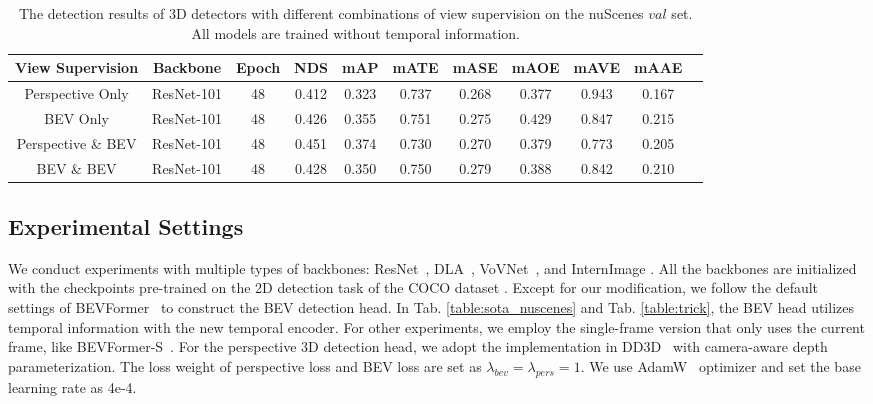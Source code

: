 \documentclass[10pt,twocolumn,letterpaper]{article}
\begin{document}
\begin{table*}[t]
    \caption{The detection results of 3D detectors with different combinations of view supervision on the nuScenes $val$ set. All models are trained without temporal information.}
    \label{table:view_supervision}
    \centering

    \begin{tabular}{c|c|c|cc|cccccc}
        \toprule
        View Supervision & Backbone & Epoch & NDS & mAP & mATE & mASE & mAOE & mAVE & mAAE   \\ 
        \midrule 
        Perspective Only & ResNet-101 & 48 & 0.412 & 0.323 & 0.737 & 0.268 & 0.377 & 0.943 & 0.167 \\ 
        BEV Only & ResNet-101 & 48 & 0.426 & 0.355 & 0.751 & 0.275 & 0.429 & 0.847 & 0.215 \\ 
        Perspective \& BEV & ResNet-101 & 48 & 0.451 & 0.374 & 0.730 & 0.270 & 0.379 & 0.773 & 0.205 \\ 
        BEV \& BEV & ResNet-101 & 48 & 0.428 & 0.350 & 0.750 & 0.279 & 0.388 & 0.842 & 0.210 \\ 
        \midrule
        \bottomrule
    \end{tabular}
    
\end{table*} 
\subsection{Experimental Settings}
We conduct experiments with multiple types of backbones: ResNet~\cite{ResNet}, DLA~\cite{DLA}, VoVNet~\cite{Vovnet}, and InternImage \cite{InternImage}. 
All the backbones are initialized with the checkpoints pre-trained on the 2D detection task of the COCO dataset \cite{COCO}. 
Except for our modification, we follow the default settings of BEVFormer~\cite{bevformer} to construct the BEV detection head. 
In Tab. \ref{table:sota_nuscenes} and Tab. \ref{table:trick}, the BEV head utilizes temporal information with the new temporal encoder. For other experiments, we employ the single-frame version that only uses the current frame, like BEVFormer-S~\cite{bevformer}. 
For the perspective 3D detection head, we adopt the implementation in DD3D~\cite{DD3D} with camera-aware depth parameterization. 
The loss weight of perspective loss and BEV loss are set as $\lambda_{bev}=\lambda_{pers}=1$. 
We use AdamW~\cite{AdamW} optimizer and set the base learning rate as 4e-4. 
\end{document}

